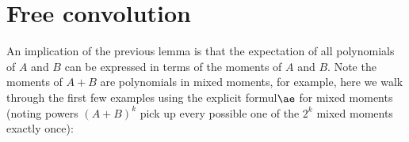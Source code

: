\section{Free convolution}
An implication of the previous lemma is that the expectation of all polynomials of $A$ and $B$ can be expressed in terms of the moments of $A$ and $B$. Note the moments of $A+B$ are polynomials in mixed moments, for example, here we walk through the first few examples using the explicit formul\ensuremath{\ae} for mixed moments (noting powers $(A+B)^k$ pick up every possible one of the $2^k$ mixed moments exactly once):
